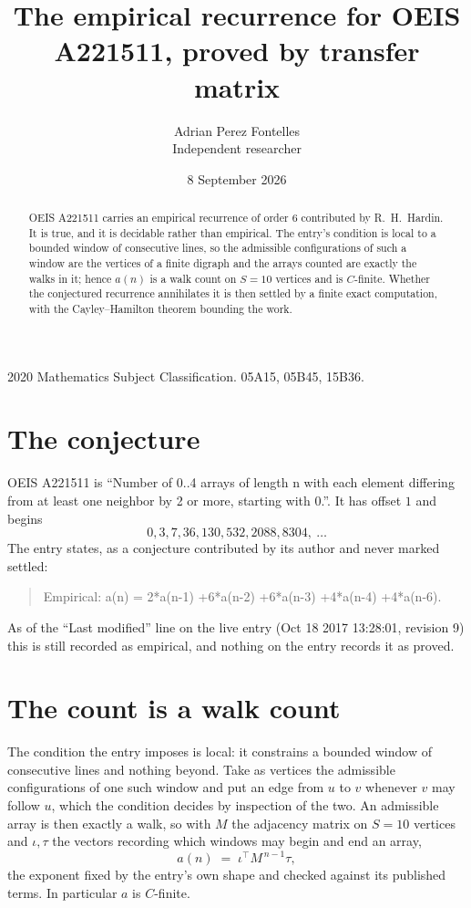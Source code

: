 \documentclass[11pt,a4paper]{article}
\title{The empirical recurrence for OEIS A221511, proved by transfer matrix}
\author{Adrian Perez Fontelles\\ \small Independent researcher}
\date{8 September 2026}
\theoremstyle{plain}
\theoremstyle{definition}
\begin{document}
\maketitle

\begin{abstract}
OEIS A221511 carries an empirical recurrence of order $6$ contributed by R.~H.~Hardin. It is
true, and it is decidable rather than empirical. The entry's condition is local to a bounded window of consecutive lines, so
the admissible configurations of such a window are the vertices of a finite digraph and the
arrays counted are exactly the walks in it; hence $a(n)$ is a walk count on $S=10$ vertices
and is $C$-finite. Whether the conjectured recurrence annihilates it is then settled by a
finite exact computation, with the Cayley--Hamilton theorem bounding the work.
\end{abstract}

\noindent\small 2020 Mathematics Subject Classification. 05A15, 05B45, 15B36.\normalsize

\section{The conjecture}

OEIS A221511 is ``Number of 0..4 arrays of length n with each element differing from at least one neighbor by 2 or more, starting with 0.''. It has offset $1$ and begins
\[
0, 3, 7, 36, 130, 532, 2088, 8304,\ \dots
\]
The entry states, as a conjecture contributed by its author and never marked settled:
\begin{quote}
Empirical: a(n) = 2*a(n-1) +6*a(n-2) +6*a(n-3) +4*a(n-4) +4*a(n-6).
\end{quote}
As of the ``Last modified'' line on the live entry (Oct 18 2017 13:28:01, revision 9) this is still
recorded as empirical, and nothing on the entry records it as proved.

\section{The count is a walk count}

The condition the entry imposes is local: it constrains a bounded window of consecutive lines and nothing beyond. Take as
vertices the admissible configurations of one such window and put an edge from $u$ to $v$
whenever $v$ may follow $u$, which the condition decides by inspection of the two. An
admissible array is then exactly a walk, so with $M$ the adjacency matrix on $S=10$ vertices
and $\iota,\tau$ the vectors recording which windows may begin and end an array,
\[
a(n)\;=\;\iota^{\!\top}M^{\,n-1}\tau ,
\]
the exponent fixed by the entry's own shape and checked against its published terms. In
particular $a$ is $C$-finite.
\end{document}

